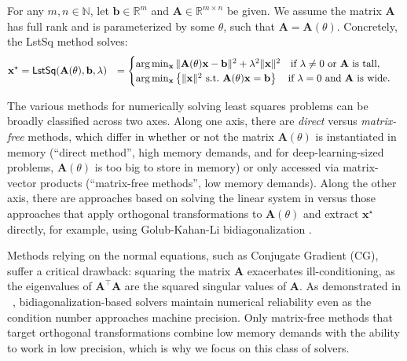 For any $m, n \in \mathbb{N}$, let $\mathbf{b} \in \mathbb{R}^m$ and $\mathbf{A} \in \mathbb{R}^{m \times n}$ be given. We assume the matrix $\mathbf{A}$ has full rank and is parameterized by some $\theta$, such that $\mathbf{A} = \mathbf{A}(\theta)$. Concretely, the \textsf{LstSq} method solves:
\begin{align}
\label{eq:constr_lsq_param}
    \mathbf{x}^\star 
    &= \textsf{LstSq}(\mathbf{A}(\theta), \mathbf{b}, \lambda)
    &= \begin{cases} 
    \arg\min_{\mathbf{x}} \|\mathbf{A}(\theta) \mathbf{x} - \mathbf{b}\|^2  + \lambda^2 \|\mathbf{x}\|^2 
    \quad \text{if}~\lambda \neq 0 \text{ or $\mathbf{A}$ is tall}, \\ 
    \arg\min_{\mathbf{x}}\left\{ \|\mathbf{x}\|^2 ~ \text{s.t.} ~ \mathbf{A}(\theta) \mathbf{x} = \mathbf{b} \right\} 
    \quad \text{if $\lambda = 0$\text{ and }$\mathbf{A}$ is wide.}
    \end{cases} \nonumber
\end{align}

The various methods for numerically solving least squares problems can be broadly classified across two axes.
Along one axis, there are \emph{direct} versus \emph{matrix-free} methods, which differ in whether or not the matrix $\mathbf{A}(\theta)$ is instantiated in memory (``direct method'', high memory demands, and for deep-learning-sized problems, $\mathbf{A}(\theta)$ is too big to store in memory) or only accessed via matrix-vector products (``matrix-free methods'', low memory demands).
Along the other axis, there are approaches based on solving the linear system in  versus those approaches that apply orthogonal transformations to $\mathbf{A}(\theta)$ and extract $\mathbf{x}^\star$ directly, for example, using Golub-Kahan-Li bidiagonalization \citep{golub1965calculating}. 

Methods relying on the normal equations, such as Conjugate Gradient (CG), suffer a critical drawback: squaring the matrix $\mathbf{A}$ exacerbates ill-conditioning, as the eigenvalues of $\mathbf{A}^\top \mathbf{A}$ are the squared singular values of $\mathbf{A}$. As demonstrated in ~, bidiagonalization-based solvers maintain numerical reliability even as the condition number approaches machine precision. Only matrix-free methods that target orthogonal transformations combine low memory demands with the ability to work in low precision, which is why we focus on this class of solvers. 

